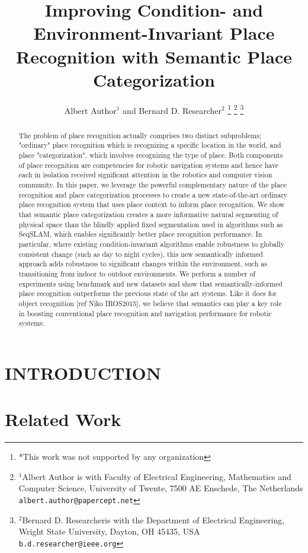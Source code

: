 \documentclass[letterpaper, 10 pt, conference]{ieeeconf}  %
\title{\LARGE \bf
Improving Condition- and Environment-Invariant Place Recognition with Semantic Place Categorization
}
\author{Albert Author$^{1}$ and Bernard D. Researcher$^{2}$%
\thanks{*This work was not supported by any organization}%
\thanks{$^{1}$Albert Author is with Faculty of Electrical Engineering, Mathematics and Computer Science,
        University of Twente, 7500 AE Enschede, The Netherlands
        {\tt\small albert.author@papercept.net}}%
\thanks{$^{2}$Bernard D. Researcheris with the Department of Electrical Engineering, Wright State University,
        Dayton, OH 45435, USA
        {\tt\small b.d.researcher@ieee.org}}%
}
\begin{document}
\maketitle
\thispagestyle{empty}
\pagestyle{empty}


\begin{abstract}
The problem of place recognition actually comprises two distinct subproblems; "ordinary" place recognition which is recognizing a specific location in the world, and place "categorization", which involves recognizing the type of place. Both components of place recognition are competencies for robotic navigation systems and hence have each in isolation received significant attention in the robotics and computer vision community. In this paper, we leverage the powerful complementary nature of the place recognition and place categorization processes to create a new state-of-the-art ordinary place recognition system that uses place context to inform place recognition. We show that semantic place categorization creates a more informative natural segmenting of physical space than the blindly applied fixed segmentation used in algorithms such as SeqSLAM, which enables significantly better place recognition performance. In particular, where existing condition-invariant algorithms enable robustness to globally consistent change (such as day to night cycles), this new semantically informed approach adds robustness to significant changes within the environment, such as transitioning from indoor to outdoor environments. We perform a number of experiments using benchmark and new datasets and show that semantically-informed place recognition outperforms the previous state of the art systems. Like it does for object recognition [ref Niko IROS2015], we believe that  semantics can play a key role in boosting conventional place recognition and navigation performance for robotic systems.
\end{abstract}

\section{INTRODUCTION}

\section{Related Work}
\end{document}
